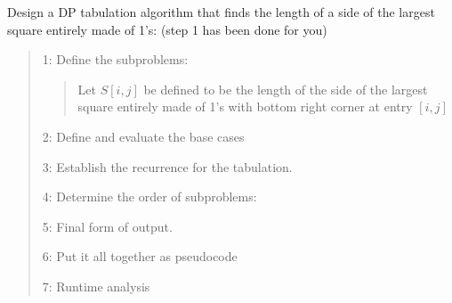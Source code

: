 \documentclass[10pt,letterpaper,unboxed,cm]{article}
\begin{document}
\begin{enumerate}
Design a DP tabulation algorithm that finds the length of a side of the largest square entirely made of 1's: (step 1 has been done for you)

\begin{quote}
1: Define the subproblems:
\begin{quote}
Let $S[i,j]$ be defined to be the length of the side of the largest square entirely made of 1's with bottom right corner at entry $[i,j]$
\end{quote}

2: Define and evaluate the base cases

3: Establish the recurrence for the tabulation.

4: Determine the order of subproblems:

5: Final form of output.

6: Put it all together as pseudocode

7: Runtime analysis


\end{quote}

\end{enumerate}
\end{document}
